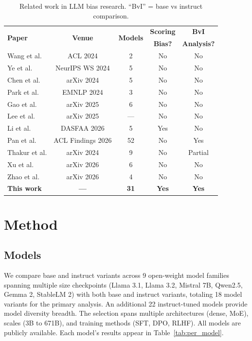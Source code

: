 \documentclass[11pt,twocolumn]{article}
\begin{document}
\begin{table}[h]
\centering\small
\caption{Related work in LLM bias research. ``BvI'' = base vs instruct comparison.}
\label{tab:related}
\begin{tabular}{lcccc}
\toprule
\multirow{2}{*}{\textbf{Paper}} & \multirow{2}{*}{\textbf{Venue}} & \multirow{2}{*}{\textbf{Models}} & \textbf{Scoring} & \textbf{BvI} \\
& & & \textbf{Bias?} & \textbf{Analysis?} \\
\midrule
Wang et al. \cite{wang2023large} & ACL 2024 & 2 & No & No \\
Ye et al. \cite{ye2024justice} & NeurIPS WS 2024 & 5 & No & No \\
Chen et al. \cite{chen2024humans} & arXiv 2024 & 5 & No & No \\
Park et al. \cite{park2024offsetbias} & EMNLP 2024 & 3 & No & No \\
Gao et al. \cite{gao2025evaluating} & arXiv 2025 & 6 & No & No \\
Lee et al. \cite{lee2025correctly} & arXiv 2025 & --- & No & No \\
Li et al. \cite{li2025scoring} & DASFAA 2026 & 5 & Yes & No \\
Pan et al. \cite{pan2025user} & ACL Findings 2026 & 52 & No & Yes \\
Thakur et al. \cite{thakur2024judging} & arXiv 2024 & 9 & No & Partial \\
Xu et al. \cite{xu2026position} & arXiv 2026 & 6 & No & No \\
Zhao et al. \cite{zhao2026bias} & arXiv 2026 & 4 & No & No \\
\midrule
\textbf{This work} & \textbf{---} & \textbf{31} & \textbf{Yes} & \textbf{Yes} \\
\bottomrule
\end{tabular}
\end{table}

\section{Method}

\subsection{Models}
We compare base and instruct variants across 9 open-weight model families spanning multiple size checkpoints (Llama 3.1, Llama 3.2, Mistral 7B, Qwen2.5, Gemma 2, StableLM 2) with both base and instruct variants, totaling 18 model variants for the primary analysis. An additional 22 instruct-tuned models provide model diversity breadth. The selection spans multiple architectures (dense, MoE), scales (3B to 671B), and training methods (SFT, DPO, RLHF). All models are publicly available. Each model's results appear in Table~\ref{tab:per_model}.
\end{document}
